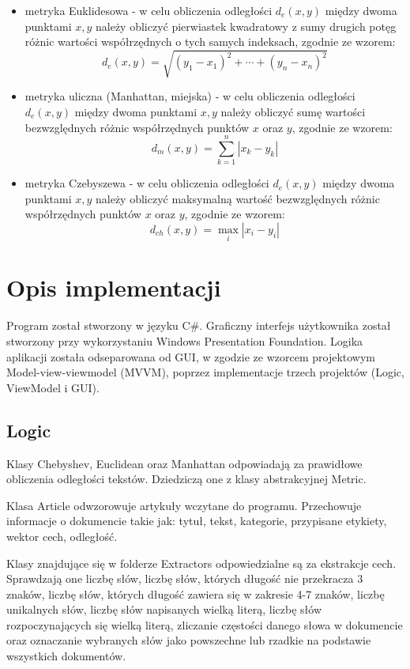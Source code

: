 \documentclass{classrep}
\begin{document}
\begin{itemize}
\item metryka Euklidesowa - w celu obliczenia odległości $ d_{e}(x,y) $ między dwoma punktami $ x, y $ należy obliczyć pierwiastek kwadratowy z sumy drugich potęg różnic wartości współrzędnych o tych samych indeksach, zgodnie ze wzorem:
$$
d_{e}(x,y)= \sqrt{ (y_{1} - x_{1})^2 + \cdots + (y_{n} - x_{n})^2 }
$$

\item metryka uliczna (Manhattan, miejska) - w celu obliczenia odległości $ d_{e}(x,y) $ między dwoma punktami $ x, y $ należy obliczyć sumę wartości bezwzględnych różnic współrzędnych punktów $ x $ oraz $ y $, zgodnie ze wzorem:
$$
d_{m}(x,y)= \sum_{k=1}^{n} | x_{k} - y_{k} |
$$

\item metryka Czebyszewa - w celu obliczenia odległości $ d_{e}(x,y) $ między dwoma punktami $ x, y $ należy obliczyć maksymalną wartość bezwzględnych różnic współrzędnych punktów $ x $ oraz $ y $, zgodnie ze wzorem:
$$
d_{ch}(x,y)= \max_{i} |x_{i} - y_{i}|
$$
\newline
\end{itemize}

\section{Opis implementacji}
Program został stworzony w języku C\#. Graficzny interfejs użytkownika został stworzony przy  wykorzystaniu Windows Presentation Foundation. Logika aplikacji została odseparowana od GUI, w zgodzie ze wzorcem projektowym Model-view-viewmodel (MVVM), poprzez implementacje trzech projektów (Logic, ViewModel i GUI).

\subsection{Logic}
Klasy Chebyshev, Euclidean oraz Manhattan odpowiadają za prawidłowe obliczenia odległości tekstów. Dziedziczą one z klasy abstrakcyjnej Metric. \newline

Klasa Article odwzorowuje artykuły wczytane do programu. Przechowuje informacje o dokumencie takie jak: tytuł, tekst, kategorie, przypisane etykiety, wektor cech, odległość. \newline

Klasy znajdujące się w folderze Extractors odpowiedzialne są za ekstrakcje cech. Sprawdzają one liczbę słów, liczbę słów, których długość nie przekracza 3 znaków, liczbę słów, których długość zawiera się w zakresie 4-7 znaków, liczbę unikalnych słów, liczbę słów napisanych wielką literą, liczbę słów rozpoczynających się wielką literą, zliczanie częstości danego słowa w dokumencie oraz oznaczanie wybranych słów jako powszechne lub rzadkie na podstawie wszystkich dokumentów.  \newline
\end{document}
